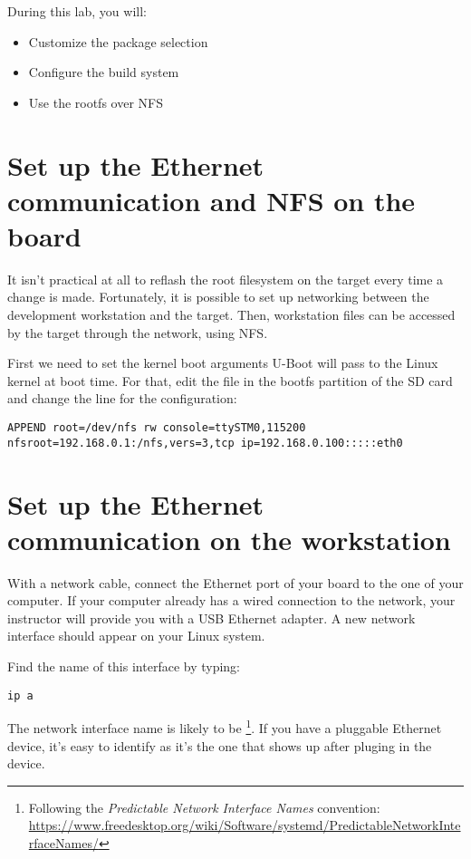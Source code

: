 
During this lab, you will:
\begin{itemize}
  \item Customize the package selection
  \item Configure the build system
  \item Use the rootfs over NFS
\end{itemize}

\section{Set up the Ethernet communication and NFS on the board}

It isn't practical at all to reflash the root filesystem on the target
every time a change is made. Fortunately, it is possible to set up
networking between the development workstation and the target. Then,
workstation files can be accessed by the target through the network,
using NFS.

First we need to set the kernel boot arguments U-Boot will pass to the
Linux kernel at boot time. For that, edit the
 file in the bootfs partition of the SD
card and change the  line for the
 configuration:

\begin{verbatim}
APPEND root=/dev/nfs rw console=ttySTM0,115200 nfsroot=192.168.0.1:/nfs,vers=3,tcp ip=192.168.0.100:::::eth0
\end{verbatim}

\section{Set up the Ethernet communication on the workstation}

With a network cable, connect the Ethernet port of your board to the
one of your computer. If your computer already has a wired connection
to the network, your instructor will provide you with a USB Ethernet
adapter. A new network interface should appear on your Linux system.

Find the name of this interface by typing:
\begin{verbatim}
ip a
\end{verbatim}

The network interface name is likely to be
\footnote{Following the {\em Predictable Network Interface
Names} convention:
\url{https://www.freedesktop.org/wiki/Software/systemd/PredictableNetworkInterfaceNames/}}.
If you have a pluggable Ethernet device, it's easy to identify as it's
the one that shows up after pluging in the device.

